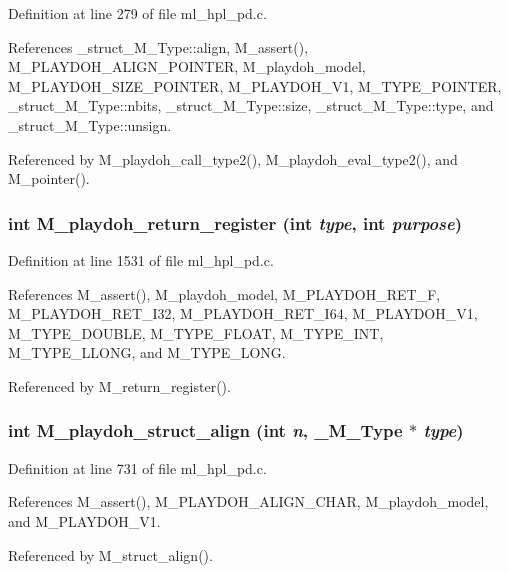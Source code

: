 Definition at line 279 of file ml\_\-hpl\_\-pd.c.

References \_\-struct\_\-M\_\-Type::align, M\_\-assert(), M\_\-PLAYDOH\_\-ALIGN\_\-POINTER, M\_\-playdoh\_\-model, M\_\-PLAYDOH\_\-SIZE\_\-POINTER, M\_\-PLAYDOH\_\-V1, M\_\-TYPE\_\-POINTER, \_\-struct\_\-M\_\-Type::nbits, \_\-struct\_\-M\_\-Type::size, \_\-struct\_\-M\_\-Type::type, and \_\-struct\_\-M\_\-Type::unsign.

Referenced by M\_\-playdoh\_\-call\_\-type2(), M\_\-playdoh\_\-eval\_\-type2(), and M\_\-pointer().
\subsubsection{\setlength{\rightskip}{0pt plus 5cm}int M\_\-playdoh\_\-return\_\-register (int {\em type}, int {\em purpose})}\label{ml__hpl__pd_8c_0710238b14ebf3f6b41e6d931dfd6564}




Definition at line 1531 of file ml\_\-hpl\_\-pd.c.

References M\_\-assert(), M\_\-playdoh\_\-model, M\_\-PLAYDOH\_\-RET\_\-F, M\_\-PLAYDOH\_\-RET\_\-I32, M\_\-PLAYDOH\_\-RET\_\-I64, M\_\-PLAYDOH\_\-V1, M\_\-TYPE\_\-DOUBLE, M\_\-TYPE\_\-FLOAT, M\_\-TYPE\_\-INT, M\_\-TYPE\_\-LLONG, and M\_\-TYPE\_\-LONG.

Referenced by M\_\-return\_\-register().
\subsubsection{\setlength{\rightskip}{0pt plus 5cm}int M\_\-playdoh\_\-struct\_\-align (int {\em n}, \bf{\_\-M\_\-Type} $\ast$ {\em type})}\label{ml__hpl__pd_8c_a2d256cf4d80591be32c95347f64b1d8}




Definition at line 731 of file ml\_\-hpl\_\-pd.c.

References M\_\-assert(), M\_\-PLAYDOH\_\-ALIGN\_\-CHAR, M\_\-playdoh\_\-model, and M\_\-PLAYDOH\_\-V1.

Referenced by M\_\-struct\_\-align().
